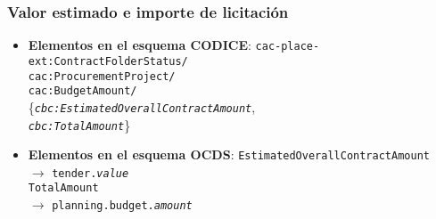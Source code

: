        \subsubsection{Valor estimado e importe de licitación}
            \begin{itemize}
                \item \textbf{Elementos en el esquema CODICE}:
                    \tabto{7.7cm} \texttt{cac-place-ext:ContractFolderStatus/} \\
                    \tabto{7.7cm} \texttt{cac:ProcurementProject/} \\
                    \tabto{7.7cm} \texttt{cac:BudgetAmount/} \\
                    \tabto{7.7cm} \{\texttt{\textit{cbc:EstimatedOverallContractAmount}}, \\
                    \tabto{7.7cm} \texttt{\textit{cbc:TotalAmount}}\}
                \item \textbf{Elementos en el esquema OCDS}:
                    \tabto{7.7cm} \texttt{EstimatedOverallContractAmount} \\ \tabto{8cm} $\rightarrow$ \texttt{tender.\textit{value}} \\
                    \tabto{7.7cm} \texttt{TotalAmount} \\ \tabto{8cm} $\rightarrow$ \texttt{planning.budget.\textit{amount}}
            \end{itemize}
        

